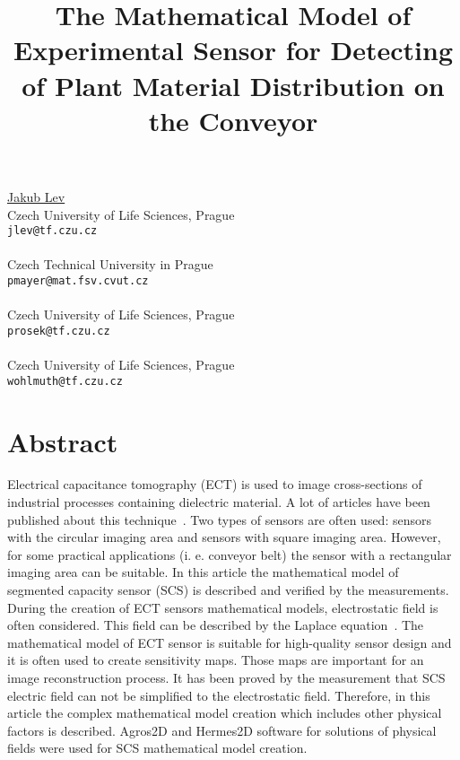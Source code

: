 \title{The Mathematical Model of Experimental Sensor for Detecting of Plant Material Distribution on the Conveyor}
 \author{} \institute{}
\maketitle
\begin{center}
{\large \underline{Jakub Lev}}\\
Czech University of Life Sciences, Prague\\
{\tt jlev@tf.czu.cz}
\\ \vspace{4mm}{\large Petr Mayer}\\
Czech Technical University in Prague\\
{\tt pmayer@mat.fsv.cvut.cz}
\\ \vspace{4mm}{\large Vaclav Prosek}\\
Czech University of Life Sciences, Prague\\
{\tt prosek@tf.czu.cz}
\\ \vspace{4mm}{\large Marie Wohlmuthova}\\
Czech University of Life Sciences, Prague\\
{\tt wohlmuth@tf.czu.cz}

\end{center}

\section*{Abstract}

Electrical capacitance tomography (ECT) is used to image cross-sections of industrial processes containing dielectric material. A lot of articles have been published about this technique~\cite{xie_et_al-1,yang-2}. Two types of sensors are often used: sensors with the circular imaging area and sensors with square imaging area. However, for some practical applications (i. e. conveyor belt) the sensor with a rectangular imaging area can be suitable. In this article the mathematical model of segmented capacity sensor (SCS) is described and verified by the measurements. During the creation of ECT sensors mathematical models, electrostatic field is often considered. This field can be described by the Laplace equation~\cite{guo_et_al-3,yang_and_Liu-4}. The mathematical model of ECT sensor is suitable for high-quality sensor design and it is often used to create sensitivity maps. Those maps are important for an image reconstruction process. It has been proved by the measurement that SCS electric field can not be simplified to the electrostatic field. Therefore, in this article the complex mathematical model creation which includes other physical factors is described. Agros2D and Hermes2D software for solutions of physical fields were used for SCS mathematical model creation.

